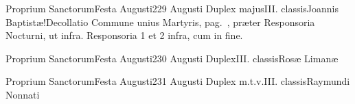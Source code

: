 \documentclass[liber-responsorialis.tex]{subfiles}
\begin{document}
	{Proprium Sanctorum}{Festa Augusti}{2}{29 Augusti}
	{Duplex majus}{III. classis}{Joannis Baptistæ!Decollatio}
	{Commune unius Martyris, pag.\ \pageref{M-UMEX}, præter Responsoria  Nocturni, ut infra.}
	{Responsoria 1 et 2 infra, cum  in fine.}

	{Proprium Sanctorum}{Festa Augusti}{2}{30 Augusti}
	{Duplex}{III. classis}{Rosæ Limanæ}
	{\vnrubric}
	{\respdetemp}

	{Proprium Sanctorum}{Festa Augusti}{2}{31 Augusti}
	{Duplex m.t.v.}{III. classis}{Raymundi Nonnati}
	{\conprubric}
	{\respdetemp}
\end{document}
